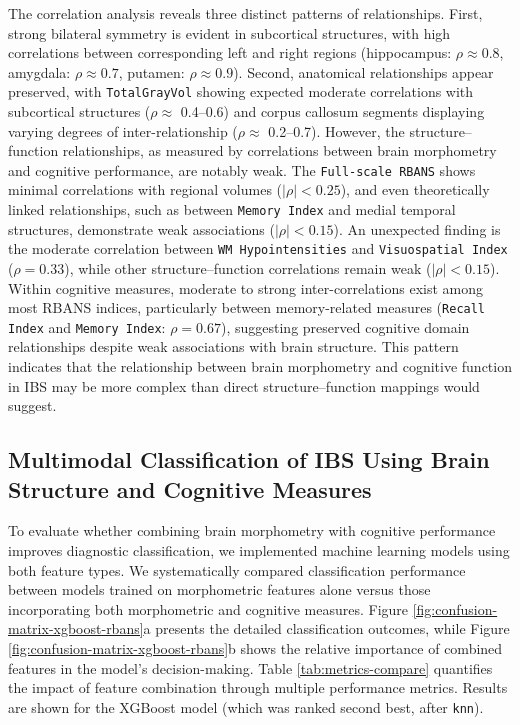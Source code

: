 \documentclass[diagnostics,article,accept,pdftex,moreauthors]{Definitions/mdpi}
\begin{document}
The correlation analysis reveals three distinct patterns of relationships. First, strong bilateral symmetry is evident in subcortical structures, with high correlations between corresponding left and right regions (hippocampus: $\rho \approx 0.8$, amygdala: $\rho \approx 0.7$, putamen: $\rho \approx 0.9$). Second, anatomical relationships appear preserved, with \texttt{TotalGrayVol} showing expected moderate correlations with subcortical structures ($\rho \approx$ 0.4--0.6) and corpus callosum segments displaying varying degrees of inter-relationship ($\rho \approx$ 0.2--0.7). However, the structure--function relationships, as measured by correlations between brain morphometry and cognitive performance, are notably weak. The \texttt{Full-scale RBANS} shows minimal correlations with regional volumes ($|\rho| < 0.25$), and even theoretically linked relationships, such as between \texttt{Memory Index} and medial temporal structures, demonstrate weak associations ($|\rho| < 0.15$). An unexpected finding is the moderate correlation between \texttt{WM Hypointensities} and \texttt{Visuospatial Index} ($\rho = 0.33$), while other structure--function correlations remain weak ($|\rho| < 0.15$). Within cognitive measures, moderate to strong inter-correlations exist among most RBANS indices, particularly between memory-related measures (\texttt{Recall Index} and \texttt{Memory Index}: $\rho = 0.67$), suggesting preserved cognitive domain relationships despite weak associations with brain structure. This pattern indicates that the relationship between brain morphometry and cognitive function in IBS may be more complex than direct structure--function mappings would suggest.




\subsection{Multimodal Classification of IBS Using Brain Structure and Cognitive Measures}



To evaluate whether combining brain morphometry with cognitive performance improves diagnostic classification, we implemented machine learning models using both feature types. We systematically compared classification performance between models trained on morphometric features alone versus those incorporating both morphometric and cognitive measures. Figure \ref{fig:confusion-matrix-xgboost-rbans}a presents the detailed classification outcomes, while Figure \ref{fig:confusion-matrix-xgboost-rbans}b shows the relative importance of combined features in the model's decision-making. Table \ref{tab:metrics-compare} quantifies the impact of feature combination through multiple performance metrics. Results are shown for the XGBoost model (which was ranked second best, after \texttt{knn}).
\end{document}
